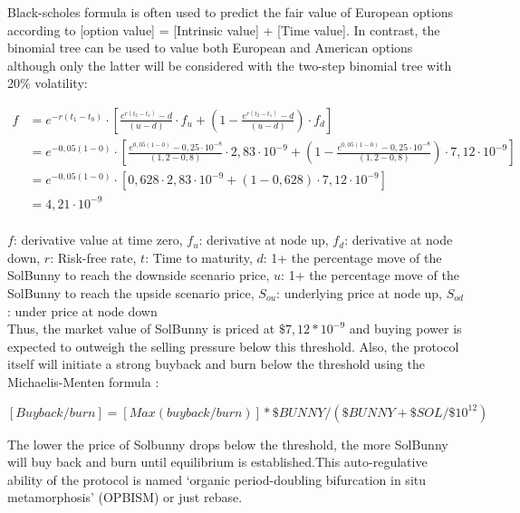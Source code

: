 \documentclass[12pt]{article}
\begin{document}
Black-scholes formula \cite{bscholes} is often used to predict the fair value of European options according to [option value] = [Intrinsic value] + [Time value]. In contrast, the binomial tree can be used to value both European and American options although only the latter will be considered with the two-step binomial tree with 20\% volatility:


\begin{equation}\label{black}
\begin{split}
f &=e^{-r(t_{1} -t_{0})} \cdot [\frac{e^{r(t_{2} - t_{1})}-d}{(u-d)} \cdot f_{u} + (1-\frac{e^{r(t_{2} - t_{1})}-d}{(u-d)}) \cdot f_{d}]\\
 &= e^{-0,05(1 - 0)} \cdot [\frac{e^{0,05(1 - 0)}-0,25\cdot10^{-8}}{(1,2-0,8)} \cdot 2,83\cdot10^{-9} + (1-\frac{e^{0,05(1 - 0)}-0,25\cdot10^{-8}}{(1,2-0,8)}) \cdot 7,12\cdot10^{-9}]\\
  &=e^{-0,05(1 - 0)} \cdot [0,628 \cdot 2,83\cdot10^{-9} + (1-0,628) \cdot 7,12\cdot10^{-9}]\\
 &=4,21\cdot10^{-9}
\end{split}
\end{equation}
\\

$f$: derivative value at time zero,
$f_{u}$: derivative at node up,
$f_{d}$: derivative at node down,
$r$: Risk-free rate,
$t$: Time to maturity,
$d$: 1+ the percentage move of the SolBunny to reach the downside scenario price,
$u$:  1+ the percentage move of the SolBunny to reach the upside scenario price,
$S_{ou}$: underlying price at node up,
$S_{od}$: under price at node down\\

Thus, the market value of SolBunny is priced at $\$7,12*10^{-9}$ and buying power is expected to outweigh the selling pressure below this threshold. Also, the protocol itself will initiate a strong buyback and burn below the threshold using the Michaelis-Menten formula \cite{mm}:

\begin{equation}\label{mm}
[Buyback/burn]=[Max (buyback/burn)] * \$BUNNY/ (\$BUNNY+ \$SOL/\$10^{12})
\end{equation}\label{mm}

The lower the price of Solbunny drops below the threshold, the more SolBunny will buy back and burn until equilibrium is established.This auto-regulative ability of the protocol is named ‘organic period-doubling bifurcation in situ metamorphosis’ (OPBISM) or just rebase.
\end{document}
